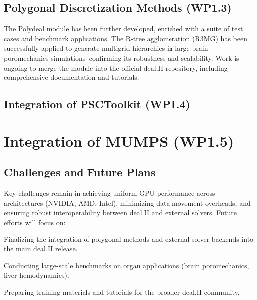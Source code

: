 \documentclass[a4paper,12pt]{article}
\begin{document}
\lipsum[4-5]

\subsection{Polygonal Discretization Methods (WP1.3)}

The Polydeal module has been further developed, enriched with a suite of test cases and benchmark applications. The R-tree agglomeration (R3MG) has been successfully applied to generate multigrid hierarchies in large brain poromechanics simulations, confirming its robustness and scalability. Work is ongoing to merge the module into the official deal.II repository, including comprehensive documentation and tutorials.

\lipsum[6]

\subsection{Integration of PSCToolkit (WP1.4)}
\lipsum[7]

\newpage

\section{Integration of MUMPS (WP1.5)}
\label{sec:section3}

\lipsum[8-9]

\subsection{Challenges and Future Plans}

Key challenges remain in achieving uniform GPU performance across architectures (NVIDIA, AMD, Intel), minimizing data movement overheads, and ensuring robust interoperability between deal.II and external solvers. Future efforts will focus on:

Finalizing the integration of polygonal methods and external solver backends into the main deal.II release.

Conducting large-scale benchmarks on organ applications (brain poromechanics, liver hemodynamics).

Preparing training materials and tutorials for the broader deal.II community.

\lipsum[20]

\label{MyLastPage}
\end{document}
